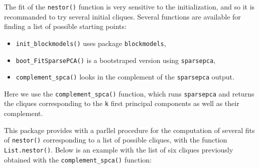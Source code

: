 The fit of the \texttt{nestor()} function is very sensitive to the
initialization, and so it is recommanded to try several initial cliques.
Several functions are available for finding a list of possible starting
points:

\begin{itemize}
\tightlist
\item
  \texttt{init\_blockmodels()} uses package \texttt{blockmodels},
\item
  \texttt{boot\_FitSparsePCA()} is a bootstraped version using
  \texttt{sparsepca},
\item
  \texttt{complement\_spca()} looks in the complement of the
  \texttt{sparsepca} output.
\end{itemize}

Here we use the \texttt{complement\_spca()} function, which runs
\texttt{sparsepca} and returns the cliques corresponding to the
\texttt{k} first principal components as well as their complement.

\begin{Shaded}
\begin{Highlighting}[]
\StringTok{ }\OperatorTok{\$}\NormalTok{) }
\CommentTok{#> [[1]]}
\CommentTok{#> [[1]][[1]]}
\CommentTok{#> }
\CommentTok{#> [[2]]}
\CommentTok{#> [[2]][[1]]}
\CommentTok{#> }
\CommentTok{#> [[3]]}
\CommentTok{#> [[3]][[1]]}
\CommentTok{#> }
\CommentTok{#> [[4]]}
\CommentTok{#> [[4]][[1]]}
\CommentTok{#> }
\CommentTok{#> [[5]]}
\CommentTok{#> [[5]][[1]]}
\CommentTok{#> }
\CommentTok{#> [[6]]}
\CommentTok{#> [[6]][[1]]}
\end{Highlighting}
\end{Shaded}

This package provides with a parllel procedure for the computation of
several fits of \texttt{nestor()} corresponding to a list of possible
cliques, with the function \texttt{List.nestor()}. Below is an example
with the list of six cliques previously obtained with the
\texttt{complement\_spca()} function:

\begin{Shaded}
\begin{Highlighting}[]
\OperatorTok{\$}\NormalTok{,}
\NormalTok{,}  \NormalTok{, }\NormalTok{)}
\end{Highlighting}
\end{Shaded}

